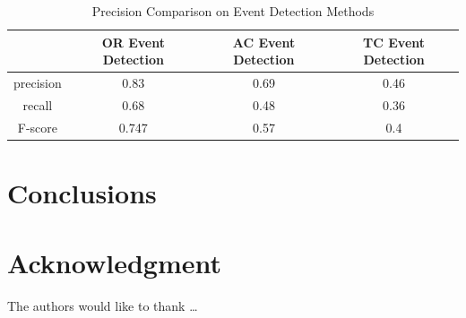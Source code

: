 \begin{table}  \centering
  \caption{Precision Comparison on Event Detection Methods}
  \label{tbl:overall-experiments}
  \begin{tabular}{cccc}
\toprule
    & OR Event Detection & AC Event Detection & TC Event Detection \\
\midrule
    precision & 0.83 & 0.69 & 0.46 \\
    recall & 0.68 & 0.48 & 0.36 \\
    F-score & 0.747 & 0.57 & 0.4 \\
\bottomrule
\end{tabular}
\end{table}


\section{Conclusions} \label{sec-conclusions}

\blindtext

\section*{Acknowledgment}

\lipsum[1]


The authors would like to thank \ldots

